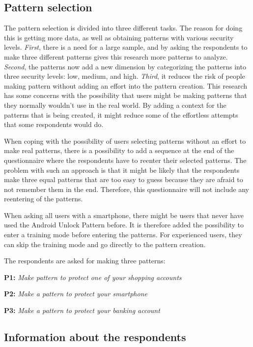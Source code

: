     \subsection*{Pattern selection}
    The pattern selection is divided into three different tasks. The reason for doing this is getting more data, as well as obtaining patterns with various security levels. {\it First}, there is a need for a large sample, and by asking the respondents to make three different patterns gives this research more patterns to analyze. {\it Second}, the patterns now add a new dimension by categorizing the patterns into three security levels: low, medium, and high. {\it Third}, it reduces the risk of people making pattern without adding an effort into the pattern creation. This research has some concerns with the possibility that users might be making patterns that they normally wouldn't use in the real world. By adding a context for the patterns that is being created, it might reduce some of the effortless attempts that some respondents would do. 

    When coping with the possibility of users selecting patterns without an effort to make real patterns, there is a possibility to add a sequence at the end of the questionnaire where the respondents have to reenter their selected patterns. The problem with such an approach is that it might be likely that the respondents make three equal patterns that are too easy to guess because they are afraid to not remember them in the end. Therefore, this questionnaire will not include any reentering of the patterns.

    When asking all users with a smartphone, there might be users that never have used the Android Unlock Pattern before. It is therefore added the possibility to enter a training mode before entering the patterns. For experienced users, they can skip the training mode and go directly to the pattern creation. 

    The respondents are asked for making three patterns: 

      {\bf P1:} {\it Make pattern to protect one of your shopping accounts}

      {\bf P2:} {\it Make a pattern to protect your smartphone}

      {\bf P3:} {\it Make a pattern to protect your banking account}

    \clearpage
    \subsection*{Information about the respondents} 

